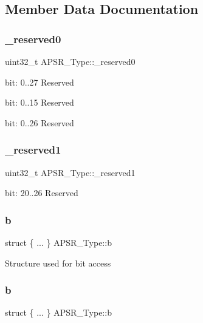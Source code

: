\subsection{Member Data Documentation}
\mbox{\label{union_a_p_s_r___type_afbce95646fd514c10aa85ec0a33db728}} 
\subsubsection{\texorpdfstring{\_reserved0}{\_reserved0}}
{\footnotesize\ttfamily uint32\+\_\+t A\+P\+S\+R\+\_\+\+Type\+::\+\_\+reserved0}

bit\+: 0..27 Reserved

bit\+: 0..15 Reserved

bit\+: 0..26 Reserved \mbox{\label{union_a_p_s_r___type_ac681f266e20b3b3591b961e13633ae13}} 
\subsubsection{\texorpdfstring{\_reserved1}{\_reserved1}}
{\footnotesize\ttfamily uint32\+\_\+t A\+P\+S\+R\+\_\+\+Type\+::\+\_\+reserved1}

bit\+: 20..26 Reserved \mbox{\label{union_a_p_s_r___type_a99c3ab089dde40ee2a043b340006df66}} 
\subsubsection{\texorpdfstring{b}{b}\hspace{0.1cm}{\footnotesize\ttfamily [1/12]}}
{\footnotesize\ttfamily struct \{ ... \}   A\+P\+S\+R\+\_\+\+Type\+::b}

Structure used for bit access \mbox{\label{union_a_p_s_r___type_a57fde0b8cbbaaba67bf0fbac8a235126}} 
\subsubsection{\texorpdfstring{b}{b}\hspace{0.1cm}{\footnotesize\ttfamily [2/12]}}
{\footnotesize\ttfamily struct \{ ... \}   A\+P\+S\+R\+\_\+\+Type\+::b}

